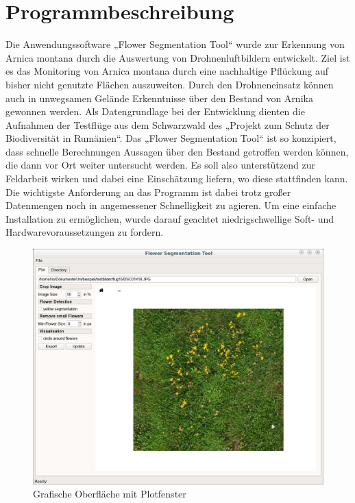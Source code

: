 \section{Programmbeschreibung}\label{programm}

Die Anwendungssoftware „Flower Segmentation Tool“ wurde zur Erkennung von Arnica montana durch die Auswertung von Drohnenluftbildern entwickelt. Ziel ist es das Monitoring von Arnica montana durch eine nachhaltige Pflückung auf bisher nicht genutzte Flächen auszuweiten. Durch den Drohneneinsatz können auch in unwegsamen Gelände Erkenntnisse über den Bestand von Arnika gewonnen werden. Als Datengrundlage bei der Entwicklung dienten die Aufnahmen der Testflüge aus dem Schwarzwald des „Projekt zum Schutz der Biodiversität in Rumänien“.
Das „Flower Segmentation Tool“ ist so konzipiert, dass schnelle Berechnungen Aussagen über den Bestand getroffen werden können, die dann vor Ort weiter untersucht werden. Es soll also unterstützend zur Feldarbeit wirken und dabei eine Einschätzung liefern, wo diese stattfinden kann. 
Die wichtigste Anforderung an das Programm ist dabei trotz großer Datenmengen noch in angemessener Schnelligkeit zu agieren. Um eine einfache Installation zu ermöglichen, wurde darauf geachtet niedrigschwellige Soft- und Hardwarevoraussetzungen zu fordern. 

\begin{figure}[hbt]
 \centering
 \includegraphics[width=\textwidth,angle=0]{abb/gui/plot-fenster-mit}
 \caption{Grafische Oberfläche mit Plotfenster}
\label{fig:gui-plot}
\end{figure}

